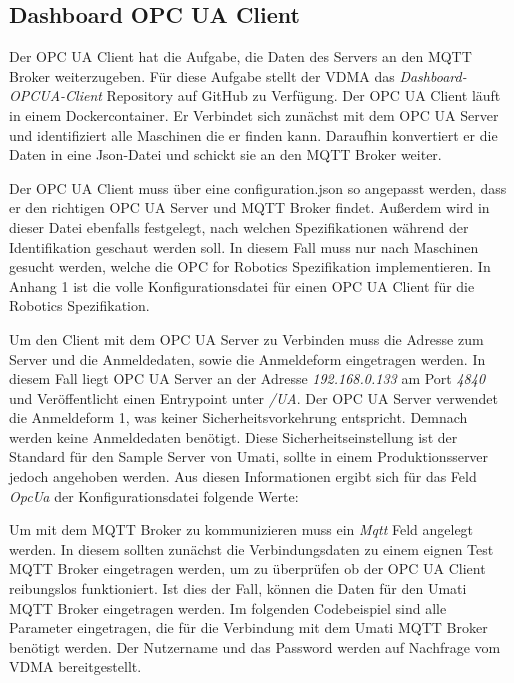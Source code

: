 \documentclass[a4paper, 12pt, oneside, toc=listofnumbered, bibliography=totoc]{scrbook}
\begin{document}
		\subsection{Dashboard OPC UA Client}\label{ch:OPCClient}
		
		Der OPC UA Client hat die Aufgabe, die Daten des Servers an den MQTT Broker weiterzugeben. Für diese Aufgabe stellt der VDMA das \textit{Dashboard-OPCUA-Client} Repository auf GitHub zu Verfügung. Der OPC UA Client läuft in einem Dockercontainer. Er Verbindet sich zunächst mit dem OPC UA Server und identifiziert alle Maschinen die er finden kann. Daraufhin konvertiert er die Daten in eine Json-Datei und schickt sie an den MQTT Broker weiter.
		
		Der OPC UA Client muss über eine configuration.json so angepasst werden, dass er den richtigen OPC UA Server und MQTT Broker findet. Außerdem wird in dieser Datei ebenfalls festgelegt, nach welchen Spezifikationen während der Identifikation geschaut werden soll. In diesem Fall muss nur nach Maschinen gesucht werden, welche die OPC for Robotics Spezifikation implementieren. In Anhang 1 ist die volle Konfigurationsdatei für einen OPC UA Client für die Robotics Spezifikation.
		
		Um den Client mit dem OPC UA Server zu Verbinden muss die Adresse zum Server und die Anmeldedaten, sowie die Anmeldeform eingetragen werden. In diesem Fall liegt OPC UA Server an der Adresse \textit{192.168.0.133} am Port \textit{4840} und Veröffentlicht einen Entrypoint unter \textit{/UA}. Der OPC UA Server verwendet die Anmeldeform 1, was keiner Sicherheitsvorkehrung entspricht. Demnach werden keine Anmeldedaten benötigt. Diese Sicherheitseinstellung ist der Standard für den Sample Server von Umati, sollte in einem Produktionsserver jedoch angehoben werden. Aus diesen Informationen ergibt sich für das Feld \textit{OpcUa} der Konfigurationsdatei folgende Werte:
		
		
		
		Um mit dem MQTT Broker zu kommunizieren muss ein \textit{Mqtt} Feld angelegt werden. In diesem sollten zunächst die Verbindungsdaten zu einem eignen Test MQTT Broker eingetragen werden, um zu überprüfen ob der OPC UA Client reibungslos funktioniert. Ist dies der Fall, können die Daten für den Umati MQTT Broker eingetragen werden. Im folgenden Codebeispiel sind alle Parameter eingetragen, die für die Verbindung mit dem Umati MQTT Broker benötigt werden. Der Nutzername und das Password werden auf Nachfrage vom VDMA bereitgestellt.
		
\end{document}
